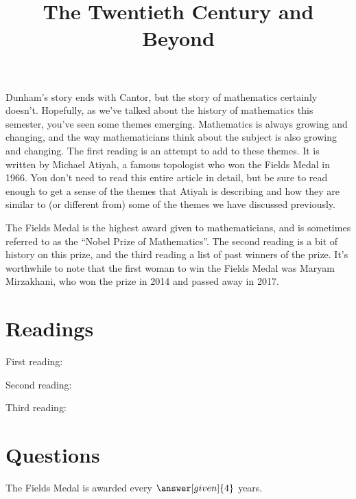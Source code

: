 \documentclass[nooutcomes]{ximera}
\title{The Twentieth Century and Beyond}
\begin{document}
\begin{abstract}
    
\end{abstract}
\maketitle

Dunham's story ends with Cantor, but the story of mathematics certainly doesn't.  Hopefully, as we've talked about the history of mathematics this semester, you've seen some themes emerging.  Mathematics is always growing and changing, and the way mathematicians think about the subject is also growing and changing.  The first reading is an attempt to add to these themes.  It is written by Michael Atiyah, a famous topologist who won the Fields Medal in 1966.  You don't need to read this entire article in detail, but be sure to read enough to get a sense of the themes that Atiyah is describing and how they are similar to (or different from) some of the themes we have discussed previously.

The Fields Medal is the highest award given to mathematicians, and is sometimes referred to as the ``Nobel Prize of Mathematics''.  The second reading is a bit of history on this prize, and the third reading a list of past winners of the prize.  It's worthwhile to note that the first woman to win the Fields Medal was Maryam Mirzakhani, who won the prize in 2014 and passed away in 2017.



\section{Readings}
First reading: 

Second reading: 

Third reading: 



\section{Questions}

\begin{question}
The Fields Medal is awarded every $\answer[given]{4}$ years.
\end{question}
\end{document}
